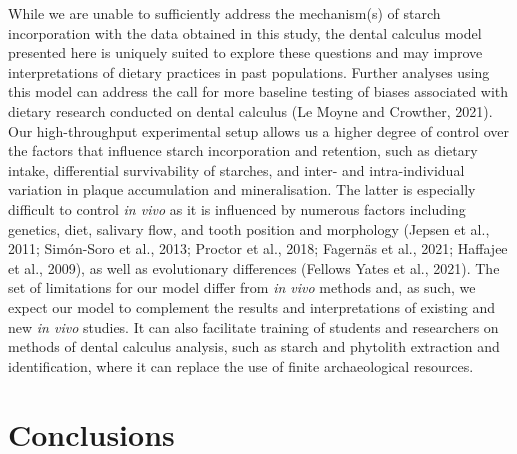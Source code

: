 \documentclass[utf8]{frontiers/frontiersSCNS}
\begin{document}
While we are unable to sufficiently address the
mechanism(s) of starch incorporation with the data obtained in this study,
the dental calculus model presented here is uniquely suited to explore
these questions and may improve interpretations of dietary practices in past
populations. Further analyses using this model can address the call for more
baseline testing of biases associated with dietary research conducted on dental calculus
(Le Moyne and Crowther, 2021).
Our high-throughput experimental setup allows us a
higher degree of control over the factors that influence starch incorporation and
retention, such as dietary intake, differential survivability of starches,
and inter- and intra-individual variation in plaque accumulation and mineralisation.
The latter is especially difficult to control \emph{in vivo} as it is influenced by
numerous factors including genetics, diet, salivary flow, and tooth position and
morphology
(Jepsen et al., 2011; Simón-Soro et al., 2013; Proctor et al., 2018; Fagernäs et al., 2021; Haffajee et al., 2009),
as well as evolutionary differences (Fellows Yates et al., 2021). The set of
limitations for our model differ from \emph{in vivo} methods and, as such, we expect
our model to complement the results and interpretations of existing and new
\emph{in vivo} studies.
It can also facilitate training of students and researchers on methods of
dental calculus analysis, such as starch and phytolith extraction and
identification, where it can replace the use of finite archaeological resources.

\hypertarget{conclusions}{%
\section{Conclusions}\label{conclusions}}
\end{document}

